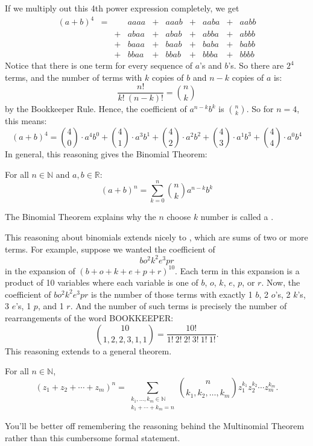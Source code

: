 If we multiply out this 4th power expression completely, we get
\[\begin{array}{rccccccccc}
(a + b)^4
   & = &    & aaaa & + & aaab & + & aaba & + & aabb \\
   &   &  + & abaa & + & abab & + & abba & + & abbb \\
   &   &  + & baaa & + & baab & + & baba & + & babb \\
   &   &  + & bbaa & + & bbab & + & bbba & + & bbbb
\end{array}\]
Notice that there is one term for every sequence of $a$'s and $b$'s.  So
there are $2^4$ terms, and the number of terms with $k$ copies of $b$ and
$n - k$ copies of $a$ is:
\[
\frac{n!}{k!\ (n-k)!} = \binom{n}{k}
\]
by the Bookkeeper Rule.  Hence, the coefficient of $a^{n-k} b^k$ is
$\binom{n}{k}$.  So for $n = 4$, this means:
\[
(a + b)^4 =
    \binom{4}{0} \cdot a^4 b^0 +
    \binom{4}{1} \cdot a^3 b^1 +
    \binom{4}{2} \cdot a^2 b^2 +
    \binom{4}{3} \cdot a^1 b^3 +
    \binom{4}{4} \cdot a^0 b^4
\]
In general, this reasoning gives the Binomial Theorem:

\begin{theorem}
For all $n \in \mathbb{N}$ and $a, b \in \mathbb{R}$:
%
\[
(a + b)^n = \sum_{k=0}^n \binom{n}{k} a^{n-k} b^k
\]
\end{theorem}
The Binomial Theorem explains why the $n$ choose $k$ number is called
a .

This reasoning about binomials extends nicely to ,
which are sums of two or more terms.  For example, suppose we wanted
the coefficient of
%
\[
b o^2 k^2 e^3 p r
\]
%
in the expansion of $(b + o + k + e + p + r)^{10}$.  Each term in this
expansion is a product of 10 variables where each variable is one of
$b$, $o$, $k$, $e$, $p$, or $r$.  Now, the coefficient of $b o^2 k^2
e^3 p r$ is the number of those terms with exactly 1 $b$, 2 $o$'s, 2
$k$'s, 3 $e$'s, 1 $p$, and 1 $r$.  And the number of such terms is
precisely the number of rearrangements of the word BOOKKEEPER:
\[
\binom{10}{1,2,2,3,1,1} = \frac{10!}{1!\ 2!\ 2!\ 3!\ 1!\ 1!}.
\]
This reasoning extends to a general theorem.

\begin{theorem}\label{multinom-thm}
For all $n \in \mathbb{N}$,
\[
(z_1 + z_2 + \cdots + z_m)^n =
   \sum_{\substack{k_1, \dots, k_m \in \mathbb{N} \\
                   k_1 + \cdots + k_m = n}}
   \binom{n}{k_1, k_2, \dots, k_m} z_1^{k_1} z_2^{k_2} \cdots z_m^{k_m}.
\]
\end{theorem}
You'll be better off remembering the reasoning behind the Multinomial
Theorem rather than this cumbersome formal statement.

